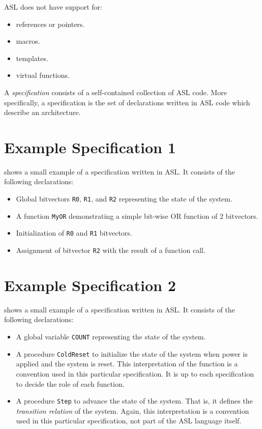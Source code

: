 ASL does not have support for:
\begin{itemize}
    \item references or pointers.
    \item macros.
    \item templates.
    \item virtual functions.
\end{itemize}

A \emph{specification} consists of a self-contained collection of ASL code.
More specifically, a specification is the set of declarations written in ASL code which describe an architecture.

\section{Example Specification 1}
 shows a small example of a specification written in ASL. It consists of the following declarations:
\begin{itemize}
    \item Global bitvectors \texttt{R0}, \texttt{R1}, and \texttt{R2} representing the state of the system.
    \item A function \texttt{MyOR} demonstrating a simple bit-wise OR function of 2 bitvectors.
    \item Initialization of \texttt{R0} and \texttt{R1} bitvectors.
    \item Assignment of bitvector \texttt{R2} with the result of a function call.
\end{itemize}

\begin{center}

\end{center}

\section{Example Specification 2}
 shows a small example of a specification written in ASL. It consists of the following declarations:
\begin{itemize}
\item A global variable \texttt{COUNT} representing the state of the system.
\item A procedure \texttt{ColdReset} to initialize the state of the system when power is applied and the system is reset.
    This interpretation of the function is a convention used in this particular specification. It is up to each
    specification to decide the role of each function.
\item A procedure \texttt{Step} to advance the state of the system. That is, it defines the \emph{transition relation} of the system.
    Again, this interpretation is a convention used in this particular specification, not part of the ASL language
    itself.
\end{itemize}

